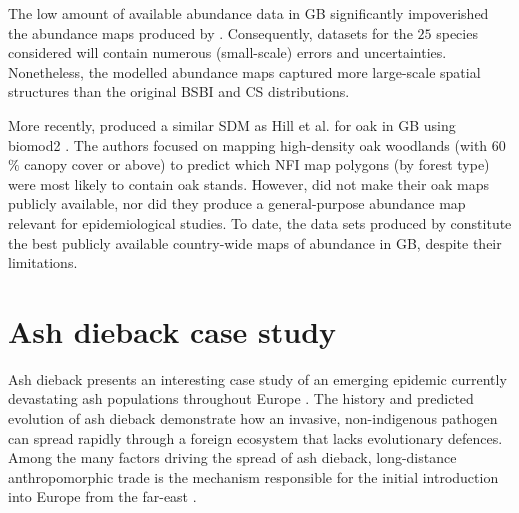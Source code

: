 The low amount of available abundance data in GB significantly impoverished the abundance maps produced by \cite{hill.data}. 
Consequently, datasets for the $25$ species considered will contain numerous (small-scale) errors and uncertainties. 
Nonetheless, the modelled abundance maps captured more large-scale spatial structures than the original BSBI and CS distributions.

More recently, \cite{ray2021multi} produced a similar SDM as Hill et al. for oak in GB using biomod2 \cite{thuiller2016package}.
The authors focused on mapping high-density oak woodlands (with 60$\%$ canopy cover or above) 
to predict which NFI map polygons (by forest type) were most likely to contain oak stands. 
However, \cite{ray2021multi} did not make their oak maps publicly available, nor did they produce a general-purpose
abundance map relevant for epidemiological studies. 
To date, the data sets produced by \cite{hill.data} constitute the best publicly available
country-wide maps of abundance in GB, despite their limitations.


\section{Ash dieback case study}


\label{ch2:ash-dieback}
Ash dieback presents an interesting case study of an emerging epidemic currently devastating ash
populations throughout Europe \cite{enderle2019overview}. The history and predicted evolution of ash dieback
demonstrate how an invasive, non-indigenous pathogen can spread rapidly through a foreign ecosystem that 
lacks evolutionary defences. Among the many factors driving the spread of ash dieback, long-distance 
anthropomorphic trade is the mechanism responsible for the initial introduction into Europe from the
far-east \cite{zhao2013hymenoscyphus, queloz2011cryptic}.

